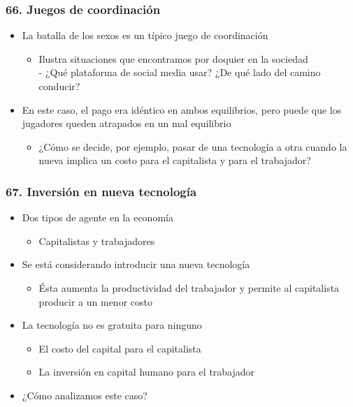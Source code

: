 \documentclass[14pt]{beamer}
\begin{document}
\begin{frame}
\frametitle{66. Juegos de coordinación}
\begin{itemize}
        \item La batalla de los sexos es un típico juego de coordinación
        \begin{itemize}
            \item Ilustra situaciones que encontramos por doquier en la sociedad \\
            - ¿Qué plataforma de social media usar? ¿De qué lado del camino conducir?
        \end{itemize}
        \item En este caso, el pago era idéntico en ambos equilibrios, pero puede que los jugadores queden atrapados en un mal equilibrio
        \begin{itemize}
            \item ¿Cómo se decide, por ejemplo, pasar de una tecnología a otra cuando la nueva implica un costo para el capitalista y para el trabajador?
        \end{itemize}
\end{itemize}
\end{frame}

\begin{frame}
\frametitle{67. Inversión en nueva tecnología}
\begin{itemize}
        \item Dos tipos de agente en la economía
        \begin{itemize}
            \item Capitalistas y trabajadores
        \end{itemize}
        \item Se está considerando introducir una nueva tecnología
        \begin{itemize}
            \item Ésta aumenta la productividad del trabajador y permite al capitalista producir a un menor costo
        \end{itemize}
        \item La tecnología no es gratuita para ninguno
        \begin{itemize}
            \item El costo del capital para el capitalista
            \item La inversión en capital humano para el trabajador
        \end{itemize}
        \item ¿Cómo analizamos este caso?
\end{itemize}
\end{frame}
\end{document}

